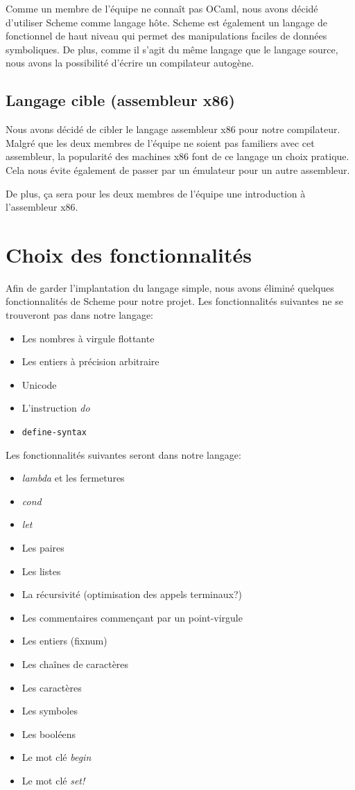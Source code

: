 \documentclass[11pt]{article}
\begin{document}
Comme un membre de l'équipe ne connaît pas OCaml, nous avons décidé
d'utiliser Scheme comme langage hôte.  Scheme est également un langage
de fonctionnel de haut niveau qui permet des manipulations faciles de
données symboliques.  De plus, comme il s'agit du même langage que le
langage source, nous avons la possibilité d'écrire un compilateur
autogène.


\subsection{Langage cible (assembleur x86)}

Nous avons décidé de cibler le langage assembleur x86 pour notre
compilateur.  Malgré que les deux membres de l'équipe ne soient pas
familiers avec cet assembleur, la popularité des machines x86 font de
ce langage un choix pratique.  Cela nous évite également de passer par
un émulateur pour un autre assembleur.

De plus, ça sera pour les deux membres de l'équipe une introduction à
l'assembleur x86.


\section{Choix des fonctionnalités}

Afin de garder l'implantation du langage simple, nous avons éliminé
quelques fonctionnalités de Scheme pour notre projet.  Les
fonctionnalités suivantes ne se trouveront pas dans notre langage:


\begin{itemize}
\item Les nombres à virgule flottante
\item Les entiers à précision arbitraire
\item Unicode
\item L'instruction \emph{do}
\item \texttt{define-syntax}
\end{itemize}

Les fonctionnalités suivantes seront dans notre langage:


\begin{itemize}
\item \emph{lambda} et les fermetures
\item \emph{cond}
\item \emph{let}
\item Les paires
\item Les listes
\item La récursivité (optimisation des appels terminaux?)
\item Les commentaires commençant par un point-virgule
\item Les entiers (fixnum)
\item Les chaînes de caractères
\item Les caractères
\item Les symboles
\item Les booléens
\item Le mot clé \emph{begin}
\item Le mot clé \emph{set!}
\end{itemize}
\end{document}
